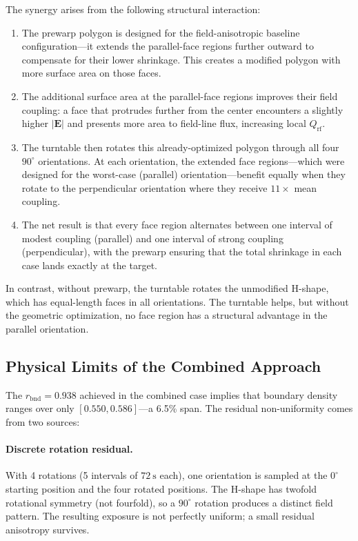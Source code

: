 \documentclass[10pt,twocolumn]{article}
\newcommand{\Qrf}{Q_{\mathrm{rf}}}
\newcommand{\vect}[1]{\boldsymbol{#1}}
\begin{document}
The synergy arises from the following structural interaction:
\begin{enumerate}
  \item The prewarp polygon is designed for the field-anisotropic
        baseline configuration---it extends the parallel-face regions
        further outward to compensate for their lower shrinkage.  This
        creates a modified polygon with more surface area on those faces.
  \item The additional surface area at the parallel-face regions
        improves their field coupling: a face that protrudes further
        from the center encounters a slightly higher $|\vect{E}|$ and
        presents more area to field-line flux, increasing local $\Qrf$.
  \item The turntable then rotates this already-optimized polygon through
        all four $90^\circ$ orientations.  At each orientation, the
        extended face regions---which were designed for the worst-case
        (parallel) orientation---benefit equally when they rotate to
        the perpendicular orientation where they receive $11\times$
        mean coupling.
  \item The net result is that every face region alternates between
        one interval of modest coupling (parallel) and one interval of
        strong coupling (perpendicular), with the prewarp ensuring that
        the total shrinkage in each case lands exactly at the target.
\end{enumerate}
In contrast, without prewarp, the turntable rotates the unmodified
H-shape, which has equal-length faces in all orientations.  The
turntable helps, but without the geometric optimization, no face region
has a structural advantage in the parallel orientation.

\subsection{Physical Limits of the Combined Approach}

The $r_{\mathrm{bnd}} = 0.938$ achieved in the combined case implies
that boundary density ranges over only $[0.550, 0.586]$---a 6.5\% span.
The residual non-uniformity comes from two sources:

\paragraph{Discrete rotation residual.}
With 4 rotations (5 intervals of $\SI{72}{\second}$ each), one
orientation is sampled at the $0^\circ$ starting position and the
four rotated positions.  The H-shape has twofold rotational symmetry
(not fourfold), so a $90^\circ$ rotation produces a distinct field
pattern.  The resulting exposure is not perfectly uniform; a small
residual anisotropy survives.
\end{document}
